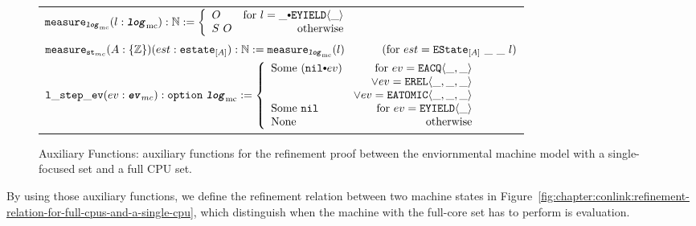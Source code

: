 \begin{figure}
\noindent{}
\begin{center}
\begin{tabular}{l}
$
   \mcmeasurekwd (l : \mclog)  : \nattype :=
     \left\{\begin{array}{lr}
        O & \text{for }  l = \listconsoppo{\yieldev{\_}}{\_} \\
        S \ O & \text{otherwise}\\
        \end{array} \right.$ \\
$ \mcstatemeasurekwd (A : \set{\ztype}) (est : \envstatekwd_{[A]}) : \nattype := \mcmeasurenoeq{l} \ \ \ \ \ \ \ \ \ \ (\text{for } est = \envstate{A}{\_}{\_}{l}) $\\
$ \localstepevkwd (ev : \mcevent) : \optiondef\ \mclog := 
     \left\{\begin{array}{lr}
        \mathrm{Some} \ (\listconsoppo{ev}{\nulllist}) & \text{for }  ev = \acqev{\_}{\_} \\
                                        & \vee  ev= \relev{\_}{\_}{\_} \\
                                        & \vee ev= \atomicev{\_}{\_}{\_} \\
        \mathrm{Some} \ \nulllist & \text{for }  ev = \yieldev{\_} \\
	   \mathrm{None} & \text{otherwise}\\
        \end{array} \right. $ \\
\end{tabular}        
\end{center}
%  
%
\caption{Auxiliary Functions:  auxiliary functions for the refinement proof between
the enviornmental machine model with a single-focused set and a full CPU set.}
\label{fig:chapter:conlink:auxiliary-function-for-full-cpus-and-a-single-cpu}
\end{figure}


By using those auxiliary functions, we define the refinement relation between two machine states in Figure~\ref{fig:chapter:conlink:refinement-relation-for-full-cpus-and-a-single-cpu}, 
which distinguish when the machine with the full-core set has to perform is evaluation.

